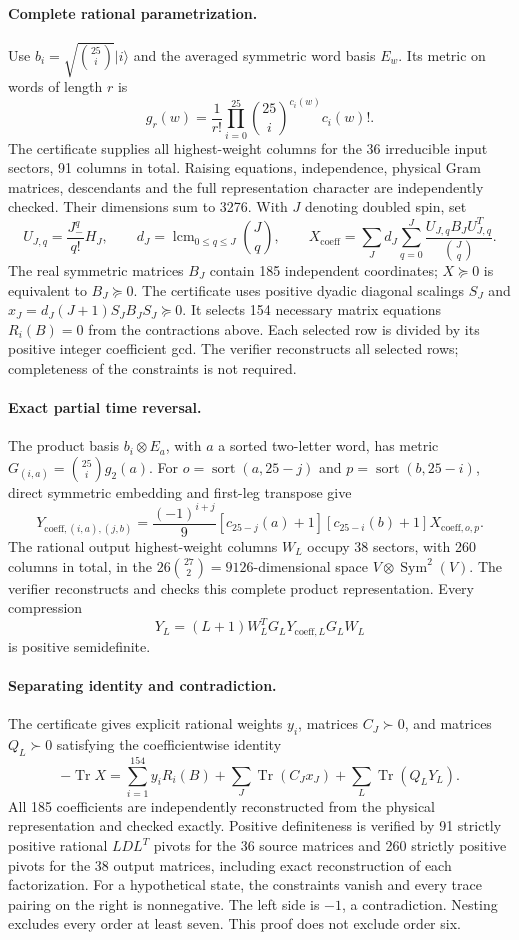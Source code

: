 \documentclass[11pt]{article}
\newcommand{\Tr}{\operatorname{Tr}}
\begin{document}
\paragraph{Complete rational parametrization.}
Use $b_i=\sqrt{\binom{25}{i}}|i\rangle$ and the averaged symmetric word basis $E_w$. Its metric on words of length $r$ is
\[
g_r(w)=\frac1{r!}\prod_{i=0}^{25}\binom{25}{i}^{c_i(w)}c_i(w)!.
\]
The certificate supplies all highest-weight columns for the 36 irreducible input sectors, 91 columns in total. Raising equations, independence, physical Gram matrices, descendants and the full representation character are independently checked. Their dimensions sum to 3276. With $J$ denoting doubled spin, set
\[
U_{J,q}=\frac{J_-^q}{q!}H_J,\qquad d_J=\operatorname{lcm}_{0\le q\le J}\binom Jq,
\qquad
X_{\mathrm{coeff}}=\sum_Jd_J\sum_{q=0}^J\frac{U_{J,q}B_JU_{J,q}^T}{\binom Jq}.
\]
The real symmetric matrices $B_J$ contain 185 independent coordinates; $X\succeq0$ is equivalent to $B_J\succeq0$. The certificate uses positive dyadic diagonal scalings $S_J$ and $x_J=d_J(J+1)S_JB_JS_J\succeq0$. It selects 154 necessary matrix equations $R_i(B)=0$ from the contractions above. Each selected row is divided by its positive integer coefficient gcd. The verifier reconstructs all selected rows; completeness of the constraints is not required.

\paragraph{Exact partial time reversal.}
The product basis $b_i\otimes E_a$, with $a$ a sorted two-letter word, has metric $G_{(i,a)}=\binom{25}{i}g_2(a)$. For $o=\operatorname{sort}(a,25-j)$ and $p=\operatorname{sort}(b,25-i)$, direct symmetric embedding and first-leg transpose give
\[
Y_{\mathrm{coeff},(i,a),(j,b)}=
\frac{(-1)^{i+j}}9[c_{25-j}(a)+1][c_{25-i}(b)+1]X_{\mathrm{coeff},o,p}.
\]
The rational output highest-weight columns $W_L$ occupy 38 sectors, with 260 columns in total, in the $26\binom{27}{2}=9126$-dimensional space $V\otimes\operatorname{Sym}^{2}(V)$. The verifier reconstructs and checks this complete product representation. Every compression
\[
Y_L=(L+1)W_L^TG_LY_{\mathrm{coeff},L}G_LW_L
\]
is positive semidefinite.

\paragraph{Separating identity and contradiction.}
The certificate gives explicit rational weights $y_i$, matrices $C_J\succ0$, and matrices $Q_L\succ0$ satisfying the coefficientwise identity
\[
\boxed{-\Tr X=\sum_{i=1}^{154}y_iR_i(B)+\sum_J\Tr(C_Jx_J)+\sum_L\Tr(Q_LY_L).}
\]
All 185 coefficients are independently reconstructed from the physical representation and checked exactly. Positive definiteness is verified by 91 strictly positive rational $LDL^T$ pivots for the 36 source matrices and 260 strictly positive pivots for the 38 output matrices, including exact reconstruction of each factorization.
For a hypothetical state, the constraints vanish and every trace pairing on the right is nonnegative. The left side is $-1$, a contradiction. Nesting excludes every order at least seven. This proof does not exclude order six.
\end{document}
